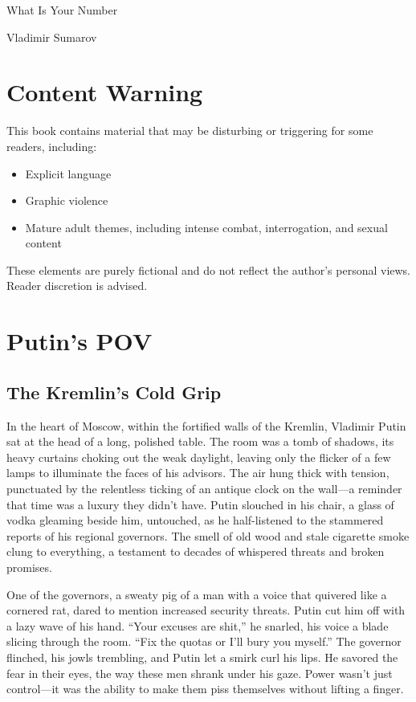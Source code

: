 \documentclass[12pt]{book}
\begin{document}
\begin{titlepage}
    \centering
    \vspace*{3cm}
    {\fontsize{48}{60}\selectfont What Is Your Number\par} %
    \vspace{2cm}
    {\Large Vladimir Sumarov\par} %
\end{titlepage}
\clearpage

\chapter*{Content Warning}
This book contains material that may be disturbing or triggering for some readers, including:
\begin{itemize}
    \item Explicit language
    \item Graphic violence
    \item Mature adult themes, including intense combat, interrogation, and sexual content
\end{itemize}
These elements are purely fictional and do not reflect the author’s personal views. Reader discretion is advised.
\clearpage

\tableofcontents
\clearpage
\chapter{Putin's POV}
\section{The Kremlin's Cold Grip}

In the heart of Moscow, within the fortified walls of the Kremlin, Vladimir Putin sat at the head of a long, polished table. The room was a tomb of shadows, its heavy curtains choking out the weak daylight, leaving only the flicker of a few lamps to illuminate the faces of his advisors. The air hung thick with tension, punctuated by the relentless ticking of an antique clock on the wall---a reminder that time was a luxury they didn’t have. Putin slouched in his chair, a glass of vodka gleaming beside him, untouched, as he half-listened to the stammered reports of his regional governors. The smell of old wood and stale cigarette smoke clung to everything, a testament to decades of whispered threats and broken promises.

One of the governors, a sweaty pig of a man with a voice that quivered like a cornered rat, dared to mention increased security threats. Putin cut him off with a lazy wave of his hand. ``Your excuses are shit,'' he snarled, his voice a blade slicing through the room. ``Fix the quotas or I’ll bury you myself.'' The governor flinched, his jowls trembling, and Putin let a smirk curl his lips. He savored the fear in their eyes, the way these men shrank under his gaze. Power wasn’t just control---it was the ability to make them piss themselves without lifting a finger.
\end{document}
